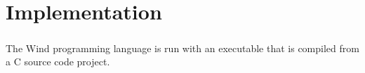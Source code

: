 
\chapter{Implementation}

\paragraph{  } The Wind programming language is run with an executable that is compiled from a C source code project.